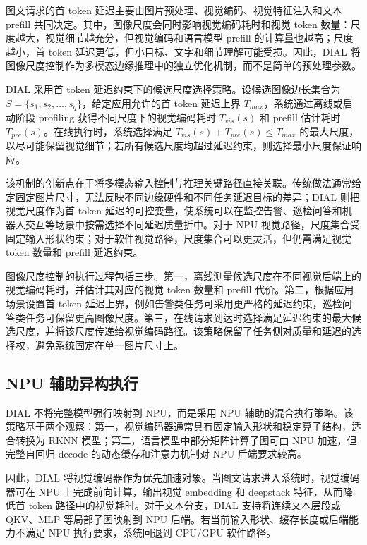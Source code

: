 \documentclass[10pt,a4paper,twocolumn]{ctexart}
\begin{document}
图文请求的首 token 延迟主要由图片预处理、视觉编码、视觉特征注入和文本 prefill 共同决定。其中，图像尺度会同时影响视觉编码耗时和视觉 token 数量：尺度越大，视觉细节越充分，但视觉编码和语言模型 prefill 的计算量也越高；尺度越小，首 token 延迟更低，但小目标、文字和细节理解可能受损。因此，DIAL 将图像尺度控制作为多模态边缘推理中的独立优化机制，而不是简单的预处理参数。

DIAL 采用首 token 延迟约束下的候选尺度选择策略。设候选图像边长集合为 \(S=\{s_1,s_2,\ldots,s_q\}\)，给定应用允许的首 token 延迟上界 \(T_{max}\)，系统通过离线或启动阶段 profiling 获得不同尺度下的视觉编码耗时 \(T_{vis}(s)\) 和 prefill 估计耗时 \(T_{pre}(s)\)。在线执行时，系统选择满足 \(T_{vis}(s)+T_{pre}(s)\le T_{max}\) 的最大尺度，以尽可能保留视觉细节；若所有候选尺度均超过延迟约束，则选择最小尺度保证响应。

该机制的创新点在于将多模态输入控制与推理关键路径直接关联。传统做法通常给定固定图片尺寸，无法反映不同边缘硬件和不同任务延迟目标的差异；DIAL 则把视觉尺度作为首 token 延迟的可控变量，使系统可以在监控告警、巡检问答和机器人交互等场景中按需选择不同延迟质量折中。对于 NPU 视觉路径，尺度集合受固定输入形状约束；对于软件视觉路径，尺度集合可以更灵活，但仍需满足视觉 token 数量和 prefill 延迟约束。

图像尺度控制的执行过程包括三步。第一，离线测量候选尺度在不同视觉后端上的视觉编码耗时，并估计其对应的视觉 token 数量和 prefill 代价。第二，根据应用场景设置首 token 延迟上界，例如告警类任务可采用更严格的延迟约束，巡检问答类任务可保留更高图像尺度。第三，在线请求到达时选择满足延迟约束的最大候选尺度，并将该尺度传递给视觉编码路径。该策略保留了任务侧对质量和延迟的选择权，避免系统固定在单一图片尺寸上。

\subsection{NPU 辅助异构执行}

DIAL 不将完整模型强行映射到 NPU，而是采用 NPU 辅助的混合执行策略。该策略基于两个观察：第一，视觉编码器通常具有固定输入形状和稳定算子结构，适合转换为 RKNN 模型；第二，语言模型中部分矩阵计算子图可由 NPU 加速，但完整自回归 decode 的动态缓存和注意力机制对 NPU 后端要求较高。

因此，DIAL 将视觉编码器作为优先加速对象。当图文请求进入系统时，视觉编码器可在 NPU 上完成前向计算，输出视觉 embedding 和 deepstack 特征，从而降低首 token 路径中的视觉耗时。对于文本分支，DIAL 支持将连续文本层段或 QKV、MLP 等局部子图映射到 NPU 后端。若当前输入形状、缓存长度或后端能力不满足 NPU 执行要求，系统回退到 CPU/GPU 软件路径。
\end{document}
